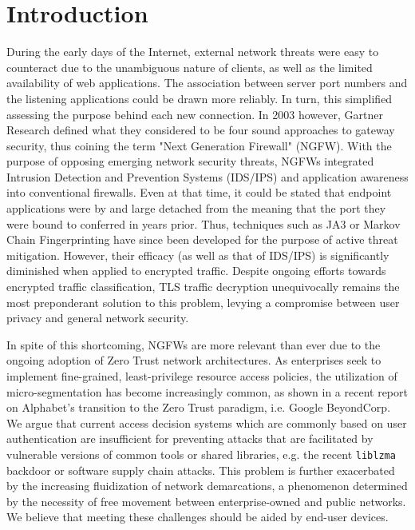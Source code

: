 \chapter{Introduction}
\label{intro:chapter}

During the early days of the Internet, external network threats were easy to counteract due to the unambiguous nature of clients, as well as the limited availability of web applications. The association between server port numbers and the listening applications could be drawn more reliably. In turn, this simplified assessing the purpose behind each new connection. In 2003 however, Gartner Research defined what they considered to be four sound approaches to gateway security, thus coining the term "Next Generation Firewall" (NGFW). With the purpose of opposing emerging network security threats, NGFWs integrated Intrusion Detection and Prevention Systems (IDS/IPS) and application awareness into conventional firewalls. Even at that time, it could be stated that endpoint applications were by and large detached from the meaning that the port they were bound to conferred in years prior. Thus, techniques such as JA3 or Markov Chain Fingerprinting have since been developed for the purpose of active threat mitigation. However, their efficacy (as well as that of IDS/IPS) is significantly diminished when applied to encrypted traffic. Despite ongoing efforts towards encrypted traffic classification, TLS traffic decryption unequivocally remains the most preponderant solution to this problem, levying a compromise between user privacy and general network security.

In spite of this shortcoming, NGFWs are more relevant than ever due to the ongoing adoption of Zero Trust network architectures. As enterprises seek to implement fine-grained, least-privilege resource access policies, the utilization of micro-segmentation has become increasingly common, as shown in a recent report on Alphabet's transition to the Zero Trust paradigm, i.e. Google BeyondCorp. We argue that current access decision systems which are commonly based on user authentication are insufficient for preventing attacks that are facilitated by vulnerable versions of common tools or shared libraries, e.g. the recent \texttt{liblzma} backdoor or software supply chain attacks. This problem is further exacerbated by the increasing fluidization of network demarcations, a phenomenon determined by the necessity of free movement between enterprise-owned and public networks. We believe that meeting these challenges should be aided by end-user devices.

